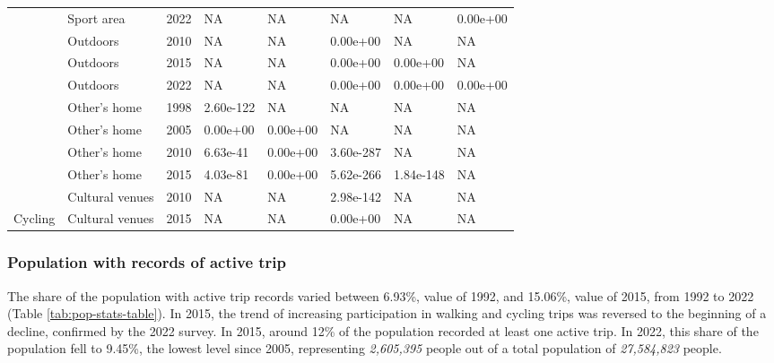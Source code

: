 \documentclass[preprint, 3p,
authoryear]{elsarticle} %
\begin{document}
\begin{table}
{\begin{tabular}[t]{llllllll}
 & Sport area & 2022 & NA & NA & NA & NA & 0.00e+00\\

 & Outdoors & 2010 & NA & NA & 0.00e+00 & NA & NA\\

 & Outdoors & 2015 & NA & NA & 0.00e+00 & 0.00e+00 & NA\\

 & Outdoors & 2022 & NA & NA & 0.00e+00 & 0.00e+00 & 0.00e+00\\

 & Other's home & 1998 & 2.60e-122 & NA & NA & NA & NA\\

 & Other's home & 2005 & 0.00e+00 & 0.00e+00 & NA & NA & NA\\

 & Other's home & 2010 & 6.63e-41 & 0.00e+00 & 3.60e-287 & NA & NA\\

 & Other's home & 2015 & 4.03e-81 & 0.00e+00 & 5.62e-266 & 1.84e-148 & NA\\

 & Cultural venues & 2010 & NA & NA & 2.98e-142 & NA & NA\\

\multirow[t]{-27}{*}{\raggedright\arraybackslash Cycling} & Cultural venues & 2015 & NA & NA & 0.00e+00 & NA & NA\\
\bottomrule
\end{tabular}}
\end{table}

\subsubsection{Population with records of active
trip}\label{population-with-records-of-active-trip}

The share of the population with active trip records varied between
6.93\%, value of 1992, and 15.06\%, value of 2015, from 1992 to 2022
(Table \ref{tab:pop-stats-table}). In 2015, the trend of increasing
participation in walking and cycling trips was reversed to the beginning
of a decline, confirmed by the 2022 survey. In 2015, around 12\% of the
population recorded at least one active trip. In 2022, this share of the
population fell to 9.45\%, the lowest level since 2005, representing
\emph{2,605,395} people out of a total population of \emph{27,584,823}
people.

\begingroup\fontsize{6}{8}\selectfont
\end{document}
